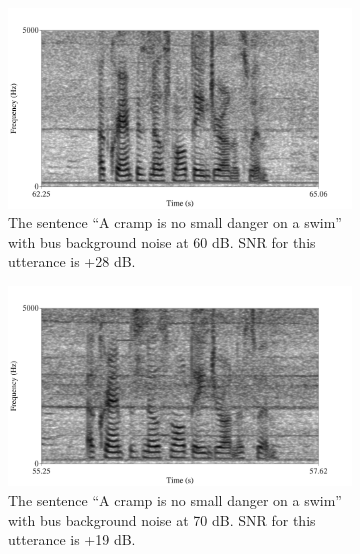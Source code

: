 \DIFdelbegin %
\DIFdelend \DIFaddbegin \begin{figure}[h!]
\DIFaddendFL \centering
\begin{subfigure}{0.475\textwidth}
  \centering
  \includegraphics[width=1\linewidth]{figure/spctgrm_cramp_bus_60.png}
  \caption{The sentence ``A cramp is no small danger on a swim'' with bus background noise at 60 dB. SNR for this utterance is +28 dB.}
  \label{fig:limitation_bus_60}
\end{subfigure}%
\hfill
\begin{subfigure}{0.475\textwidth}
  \centering
  \includegraphics[width=1\linewidth]{figure/spctgrm_cramp_bus_70.png}
  \caption{The sentence ``A cramp is no small danger on a swim'' with bus background noise at 70 dB. SNR for this utterance is +19 dB.}
  \label{fig:limitation_bus_70}
\end{subfigure}
%
\begin{center}
\begin{subfigure}{0.475\textwidth}
  \centering

\end{subfigure}
\end{center}
\end{figure}
